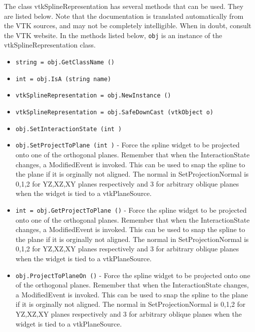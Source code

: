 The class vtkSplineRepresentation has several methods that can be used.
  They are listed below.
Note that the documentation is translated automatically from the VTK sources,
and may not be completely intelligible.  When in doubt, consult the VTK website.
In the methods listed below, \verb|obj| is an instance of the vtkSplineRepresentation class.
\begin{itemize}
\item  \verb|string = obj.GetClassName ()|

\item  \verb|int = obj.IsA (string name)|

\item  \verb|vtkSplineRepresentation = obj.NewInstance ()|

\item  \verb|vtkSplineRepresentation = obj.SafeDownCast (vtkObject o)|

\item  \verb|obj.SetInteractionState (int )|

\item  \verb|obj.SetProjectToPlane (int )| -  Force the spline widget to be projected onto one of the orthogonal planes.
 Remember that when the InteractionState changes, a ModifiedEvent is invoked.
 This can be used to snap the spline to the plane if it is orginally
 not aligned.  The normal in SetProjectionNormal is 0,1,2 for YZ,XZ,XY
 planes respectively and 3 for arbitrary oblique planes when the widget
 is tied to a vtkPlaneSource.

\item  \verb|int = obj.GetProjectToPlane ()| -  Force the spline widget to be projected onto one of the orthogonal planes.
 Remember that when the InteractionState changes, a ModifiedEvent is invoked.
 This can be used to snap the spline to the plane if it is orginally
 not aligned.  The normal in SetProjectionNormal is 0,1,2 for YZ,XZ,XY
 planes respectively and 3 for arbitrary oblique planes when the widget
 is tied to a vtkPlaneSource.

\item  \verb|obj.ProjectToPlaneOn ()| -  Force the spline widget to be projected onto one of the orthogonal planes.
 Remember that when the InteractionState changes, a ModifiedEvent is invoked.
 This can be used to snap the spline to the plane if it is orginally
 not aligned.  The normal in SetProjectionNormal is 0,1,2 for YZ,XZ,XY
 planes respectively and 3 for arbitrary oblique planes when the widget
 is tied to a vtkPlaneSource.


\end{itemize}
